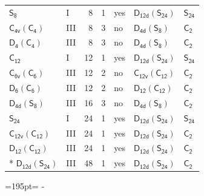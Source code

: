 \documentclass[10pt,a4paper]{article}
\newcommand{\needspace}[1]{\par\penalty-100\begingroup\dimen0=#1\relax\dimen2=\pagegoal
  \advance\dimen2-\pagetotal\ifdim\dimen0>\dimen2\relax\ifdim\dimen2>0pt\vfil\break\fi\fi
  \endgroup}
\numberwithin{equation}{section}
\newcommand{\grp}[1]{\mathsf{#1}}
\begin{document}
{\begin{longtable}{@{}llrrlll@{}}
\href{../../../rotation/data/pdf/S8.pdf}{$\grp{S_{8}}$} & I & 8 & 1 & yes & \href{D12d-S24.pdf}{$\grp{D_{12d}}(\grp{S_{24}})$} & \href{../../../rotation/data/pdf/S24.pdf}{$\grp{S_{24}}$}\\
\href{C4v-C4.pdf}{$\grp{C_{4v}}(\grp{C_{4}})$} & III & 8 & 3 & no & \href{D4d-S8.pdf}{$\grp{D_{4d}}(\grp{S_{8}})$} & \href{../../../rotation/data/pdf/C2.pdf}{$\grp{C_{2}}$}\\
\href{D4-C4.pdf}{$\grp{D_{4}}(\grp{C_{4}})$} & III & 8 & 3 & no & \href{D4d-S8.pdf}{$\grp{D_{4d}}(\grp{S_{8}})$} & \href{../../../rotation/data/pdf/C2.pdf}{$\grp{C_{2}}$}\\
\href{../../../rotation/data/pdf/C12.pdf}{$\grp{C_{12}}$} & I & 12 & 1 & yes & \href{D12d-S24.pdf}{$\grp{D_{12d}}(\grp{S_{24}})$} & \href{../../../rotation/data/pdf/S24.pdf}{$\grp{S_{24}}$}\\
\href{C6v-C6.pdf}{$\grp{C_{6v}}(\grp{C_{6}})$} & III & 12 & 2 & no & \href{C12v-C12.pdf}{$\grp{C_{12v}}(\grp{C_{12}})$} & \href{../../../rotation/data/pdf/C2.pdf}{$\grp{C_{2}}$}\\
\href{D6-C6.pdf}{$\grp{D_{6}}(\grp{C_{6}})$} & III & 12 & 2 & no & \href{D12-C12.pdf}{$\grp{D_{12}}(\grp{C_{12}})$} & \href{../../../rotation/data/pdf/C2.pdf}{$\grp{C_{2}}$}\\
\href{D4d-S8.pdf}{$\grp{D_{4d}}(\grp{S_{8}})$} & III & 16 & 3 & no & \href{D4d-S8.pdf}{$\grp{D_{4d}}(\grp{S_{8}})$} & \href{../../../rotation/data/pdf/C2.pdf}{$\grp{C_{2}}$}\\
\href{../../../rotation/data/pdf/S24.pdf}{$\grp{S_{24}}$} & I & 24 & 1 & yes & \href{D12d-S24.pdf}{$\grp{D_{12d}}(\grp{S_{24}})$} & \href{../../../rotation/data/pdf/S24.pdf}{$\grp{S_{24}}$}\\
\href{C12v-C12.pdf}{$\grp{C_{12v}}(\grp{C_{12}})$} & III & 24 & 1 & yes & \href{D12d-S24.pdf}{$\grp{D_{12d}}(\grp{S_{24}})$} & \href{../../../rotation/data/pdf/C2.pdf}{$\grp{C_{2}}$}\\
\href{D12-C12.pdf}{$\grp{D_{12}}(\grp{C_{12}})$} & III & 24 & 1 & yes & \href{D12d-S24.pdf}{$\grp{D_{12d}}(\grp{S_{24}})$} & \href{../../../rotation/data/pdf/C2.pdf}{$\grp{C_{2}}$}\\*
\href{D12d-S24.pdf}{$\grp{D_{12d}}(\grp{S_{24}})$} & III & 48 & 1 & yes & \href{D12d-S24.pdf}{$\grp{D_{12d}}(\grp{S_{24}})$} & \href{../../../rotation/data/pdf/C2.pdf}{$\grp{C_{2}}$}\\
\bottomrule\end{longtable}}
\needspace{195pt}
\end{document}

